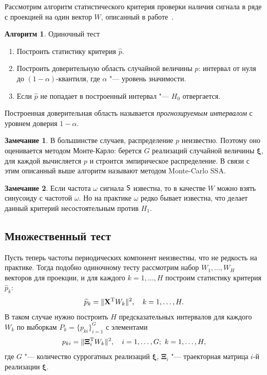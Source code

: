 \documentclass[specialist,
substylefile = spbu_report.rtx,
subf,href,colorlinks=true, 12pt]{disser}
\theoremstyle{definition}
\newtheorem{algorithm}{Алгоритм}
\newtheorem{remark}{Замечание}
\newcommand{\bfxi}{\boldsymbol{\xi}}
\begin{document}
Рассмотрим алгоритм статистического критерия проверки наличия сигнала в ряде с проекцией на один вектор $W$, описанный в работе~\cite{Golyandina_2023}.
\begin{algorithm}{Одиночный тест~\cite{Golyandina_2023}}
	\begin{enumerate}
		\item Построить статистику критерия $\widehat p$.
		\item Построить доверительную область случайной величины $p$: интервал от нуля до $(1-\alpha)$-квантиля, где $\alpha$ "--- уровень значимости.
		\item Если $\widehat p$	не попадает в построенный интервал "--- $H_0$ отвергается.
	\end{enumerate}
\end{algorithm}
Построенная доверительная область называется \textit{прогнозируемым интервалом} с уровнем доверия $1-\alpha$.
\begin{remark}
В большинстве случаев, распределение $p$ неизвестно. Поэтому оно оценивается методом Монте-Карло: берется $G$ реализаций случайной величины $\boldsymbol\xi$, для каждой вычисляется $p$ и строится эмпирическое распределение. В связи с этим описанный выше алгоритм называют методом Monte-Carlo SSA.
\end{remark}
\begin{remark}
Если частота $\omega$ сигнала $\mathsf{S}$ известна, то в качестве $W$ можно взять синусоиду с частотой $\omega$. Но на практике $\omega$ редко бывает известна, что делает данный критерий несостоятельным против $H_1$.
\end{remark}
\subsection{Множественный тест}\label{sect:multiple_test}
Пусть теперь частоты периодических компонент неизвестны, что не редкость на практике. Тогда подобно одиночному тесту рассмотрим набор $W_1,\ldots,W_H$ векторов для проекции, и для каждого $k=1,\ldots,H$ построим статистику критерия $\widehat p_k$:
\begin{equation}\label{eq:mc-ssa_statisctics}
	\widehat p_k = \|\mathbf{X}^{\mathrm{T}} W_k\|^2,\quad k=1,\ldots,H.
\end{equation}
В таком случае нужно построить $H$ предсказательных интервалов для каждого $W_k$ по выборкам $P_k=\{p_{ki}\}_{i=1}^G$ с элементами
\begin{equation}\label{eq:mc-ssa_h0}
	p_{ki}=\|\mathbf{\Xi}_i^\rmT W_k\|^2,\quad i=1,\ldots,G;\ k=1,\ldots,H,
\end{equation}
где $G$ "--- количество суррогатных реализаций $\bfxi$, $\mathbf{\Xi}_i$ "--- траекторная матрица $i$-й реализации $\bfxi$.
\end{document}
